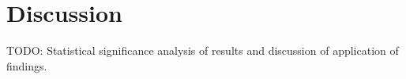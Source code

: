 \section{Discussion}
TODO: Statistical significance analysis of results and discussion of application of findings.